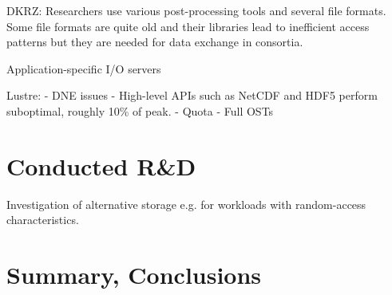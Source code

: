 \documentclass{superfri}
\numberwithin{equation}{section}
\begin{document}
DKRZ:
Researchers use various post-processing tools and several file formats.
Some file formats are quite old and their libraries lead to inefficient access patterns but they are needed for data exchange in consortia.

Application-specific I/O servers

Lustre:
- DNE issues
- High-level APIs such as NetCDF and HDF5 perform suboptimal, roughly 10\% of peak.
- Quota
- Full OSTs

\section{Conducted R\&D}
\label{sec:randd}

Investigation of alternative storage e.g. for workloads with random-access characteristics.

\section{Summary, Conclusions}
\label{sec:summary}




\end{document}
